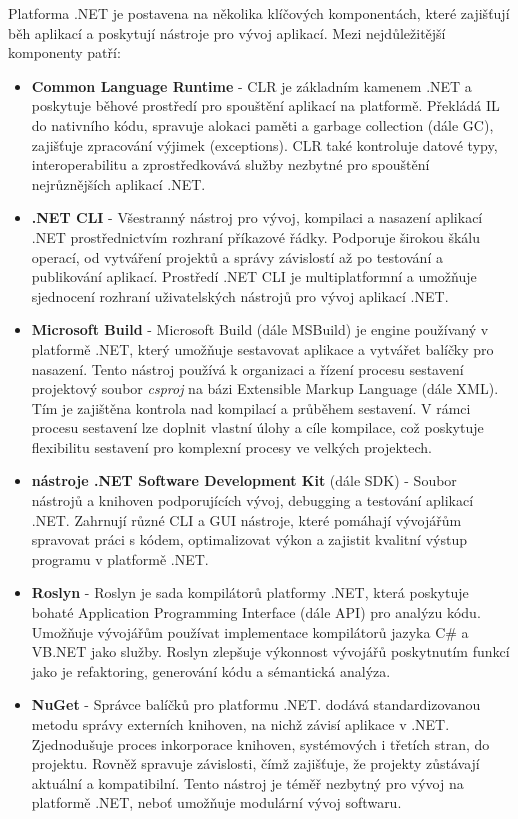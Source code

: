
Platforma .NET je postavena na několika klíčových komponentách, které zajišťují běh aplikací a poskytují nástroje pro vývoj aplikací. \cite{netdocs} Mezi nejdůležitější komponenty patří:

\begin{itemize}
    \item \textbf{Common Language Runtime} - CLR je základním kamenem .NET a poskytuje běhové prostředí pro spouštění aplikací na platformě. Překládá IL do nativního kódu, spravuje alokaci paměti a garbage collection (dále GC), zajišťuje zpracování výjimek (exceptions). CLR také kontroluje datové typy, interoperabilitu a zprostředkovává služby nezbytné pro spouštění nejrůznějších aplikací .NET.
    \item \textbf{.NET CLI} - Všestranný nástroj pro vývoj, kompilaci a nasazení aplikací .NET prostřednictvím rozhraní příkazové řádky. Podporuje širokou škálu operací, od vytváření projektů a správy závislostí až po testování a publikování aplikací. Prostředí .NET CLI je multiplatformní a umožňuje sjednocení rozhraní uživatelských nástrojů pro vývoj aplikací .NET.
    \item \textbf{Microsoft Build} - Microsoft Build (dále MSBuild) je engine používaný v platformě .NET, který umožňuje sestavovat aplikace a vytvářet balíčky pro nasazení. Tento nástroj používá k organizaci a řízení procesu sestavení projektový soubor \emph{csproj} na bázi Extensible Markup Language (dále XML). Tím je zajištěna kontrola nad kompilací a průběhem sestavení. V rámci procesu sestavení lze doplnit vlastní úlohy a cíle kompilace, což poskytuje flexibilitu sestavení pro komplexní procesy ve velkých projektech.
    \item \textbf{nástroje .NET Software Development Kit} (dále SDK) - Soubor nástrojů a knihoven podporujících vývoj, debugging a testování aplikací .NET. Zahrnují různé CLI a GUI nástroje, které pomáhají vývojářům spravovat práci s kódem, optimalizovat výkon a zajistit kvalitní výstup programu v platformě .NET.
    \item \textbf{Roslyn} - Roslyn je sada kompilátorů platformy .NET, která poskytuje bohaté Application Programming Interface (dále API) pro analýzu kódu. Umožňuje vývojářům používat implementace kompilátorů jazyka C\# a VB.NET jako služby. Roslyn zlepšuje výkonnost vývojářů poskytnutím funkcí jako je refaktoring, generování kódu a sémantická analýza.
    \item \textbf{NuGet} - Správce balíčků pro platformu .NET. dodává standardizovanou metodu správy externích knihoven, na nichž závisí aplikace v .NET. Zjednodušuje proces inkorporace knihoven, systémových i třetích stran, do projektu. Rovněž spravuje závislosti, čímž zajišťuje, že projekty zůstávají aktuální a kompatibilní. Tento nástroj je téměř nezbytný pro vývoj na platformě .NET, neboť umožňuje modulární vývoj softwaru.
\end{itemize}


